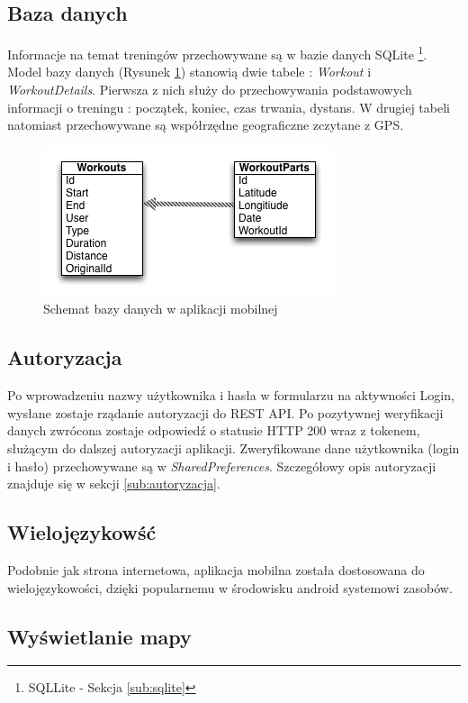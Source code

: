 \subsection{Baza danych} %
\label{sub:baza_danych}
Informacje na temat treningów przechowywane są w bazie danych SQLite \footnote{SQLLite - Sekcja \ref{sub:sqlite}}. Model bazy danych (Rysunek \ref{fig:sqlite-model}) stanowią dwie tabele : \textit{Workout} i \textit{WorkoutDetails}. Pierwsza z nich służy do przechowywania podstawowych informacji o treningu : początek, koniec, czas trwania, dystans. W drugiej tabeli natomiast przechowywane są współrzędne geograficzne zczytane z GPS.
\begin{figure}[ht]
	\centering
		\includegraphics[width=0.6\linewidth]{assets/sql_schema.png}
		\caption{Schemat bazy danych w aplikacji mobilnej}
	\label{fig:sqlite-model}
\end{figure}

\subsection{Autoryzacja} %
\label{sub:}
Po wprowadzeniu nazwy użytkownika i hasła w formularzu na aktywności Login, wysłane zostaje rządanie autoryzacji do REST API. Po pozytywnej weryfikacji danych zwrócona zostaje odpowiedź o statusie HTTP 200 wraz z tokenem, służącym do dalszej autoryzacji aplikacji. Zweryfikowane dane użytkownika (login i hasło) przechowywane są w \textit{SharedPreferences}. Szczegółowy opis autoryzacji znajduje się w sekcji \ref{sub:autoryzacja}.

\subsection{Wielojęzykowść} %
\label{sub:wieloj_zykow_}
Podobnie jak strona internetowa, aplikacja mobilna została dostosowana do wielojęzykowości, dzięki popularnemu w środowisku android systemowi zasobów.

\subsection{Wyświetlanie mapy} %
\label{sub:wy_wietlanie_mapy}
